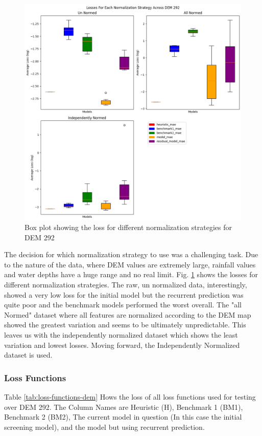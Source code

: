 \begin{figure}[tbph]
	\centering
	\includegraphics[width=0.9\linewidth, height=0.5\textheight]{"Figures/Results/Initial screening/Normalization plots/Box_Loss_Norm_strat"}
	\caption[Box plot for different normalization strategies]{Box plot showing the loss for different normalization strategies for DEM 292}
	\label{fig:norm-strat-292}
\end{figure}
The decision for which normalization strategy to use was a challenging task. Due to the nature of the data, where DEM values are extremely large, rainfall values and water depths have a huge range and no real limit. Fig. \ref{fig:norm-strat-292} shows the losses for different normalization strategies. The raw, un normalized data, interestingly, showed a very low loss for the initial model but the recurrent prediction was quite poor and the benchmark models performed the worst overall. The "all Normed" dataset where all features are normalized according to the DEM map showed the greatest variation and seems to be ultimately unpredictable. This leaves us with the independently normalized dataset which shows the least variation and lowest losses. Moving forward, the Independently Normalized dataset is used.
\subsubsection*{Loss Functions}
Table \ref{tab:loss-functions-dem} Hows the loss of all loss functions used for testing over DEM 292. The Column Names are Heuristic (H), Benchmark 1 (BM1), Benchmark 2 (BM2), The current model in question (In this case the initial screening model), and the model but using recurrent prediction.

